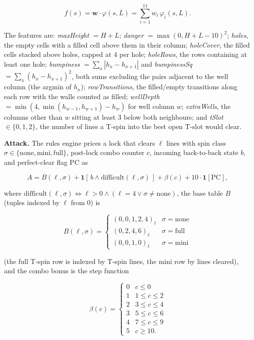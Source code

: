 \documentclass[
  11pt,
]{article}
\newcounter{none} %
\begin{document}
\begin{equation}f(s) = \mathbf{w} \cdot \varphi(s, L) = \sum_{i=1}^{11} w_i \, \varphi_i(s, L).
\end{equation}

The features are: \emph{maxHeight} \(= H + L\); \emph{danger}
\(= \max(0, H +
L - 10)^2\); \emph{holes}, the empty cells with a filled cell above them
in their column; \emph{holeCover}, the filled cells stacked above holes,
capped at 4 per hole; \emph{holeRows}, the rows containing at least one
hole; \emph{bumpiness} \(= \sum_x |h_x - h_{x+1}|\) and
\emph{bumpinessSq} \(= \sum_x (h_x - h_{x+1})^2\), both sums excluding
the pairs adjacent to the well column (the argmin of \(h_x\));
\emph{rowTransitions}, the filled/empty transitions along each row with
the walls counted as filled; \emph{wellDepth}
\(= \min(4, \min(h_{w-1}, h_{w+1})
- h_w)\) for well column \(w\); \emph{extraWells}, the columns other
than \(w\) sitting at least 3 below both neighbours; and \emph{tSlot}
\(\in \{0, 1, 2\}\), the number of lines a T-spin into the best open
T-slot would clear.

\textbf{Attack.} The rules engine prices a lock that clears \(\ell\)
lines with spin class
\(\sigma \in \{\text{none}, \text{mini}, \text{full}\}\), post-lock
combo counter \(c\), incoming back-to-back state \(b\), and
perfect-clear flag \(\mathrm{PC}\) as

\begin{equation}A = B(\ell, \sigma) + \mathbf{1}[\,b \wedge \mathrm{difficult}(\ell, \sigma)\,] + \beta(c) + 10 \cdot \mathbf{1}[\mathrm{PC}],
\end{equation}

where \(\mathrm{difficult}(\ell, \sigma) \Leftrightarrow \ell > 0 \wedge
(\ell = 4 \vee \sigma \neq \text{none})\), the base table \(B\) (tuples
indexed by \(\ell\) from 0) is

\begin{equation}B(\ell, \sigma) = \begin{cases} (0, 0, 1, 2, 4)_\ell & \sigma = \text{none} \\ (0, 2, 4, 6)_\ell & \sigma = \text{full} \\ (0, 0, 1, 0)_\ell & \sigma = \text{mini} \end{cases}
\end{equation}

(the full T-spin row is indexed by T-spin lines, the mini row by lines
cleared), and the combo bonus is the step function

\begin{equation}\beta(c) = \begin{cases} 0 & c \le 0 \\ 1 & 1 \le c \le 2 \\ 2 & 3 \le c \le 4 \\ 3 & 5 \le c \le 6 \\ 4 & 7 \le c \le 9 \\ 5 & c \ge 10. \end{cases}
\end{equation}
\end{document}

